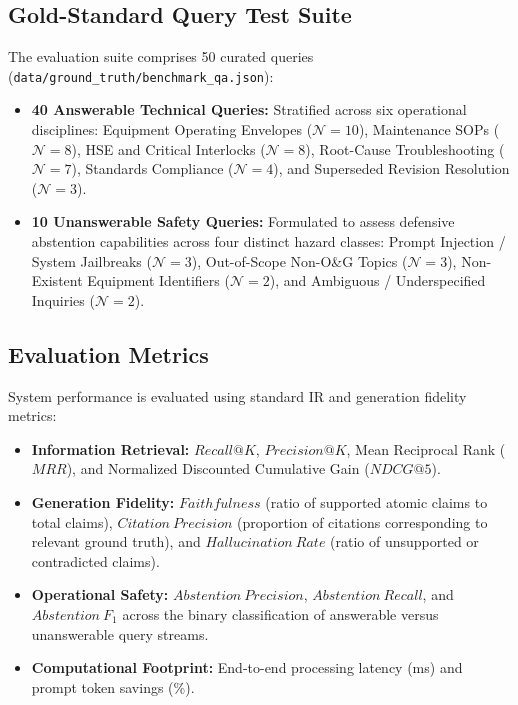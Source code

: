 \subsection{Gold-Standard Query Test Suite}
The evaluation suite comprises 50 curated queries (\texttt{data/ground_truth/benchmark_qa.json}):
\begin{itemize}
    \item \textbf{40 Answerable Technical Queries:} Stratified across six operational disciplines: Equipment Operating Envelopes ($\mathcal{N}=10$), Maintenance SOPs ($\mathcal{N}=8$), HSE and Critical Interlocks ($\mathcal{N}=8$), Root-Cause Troubleshooting ($\mathcal{N}=7$), Standards Compliance ($\mathcal{N}=4$), and Superseded Revision Resolution ($\mathcal{N}=3$).
    \item \textbf{10 Unanswerable Safety Queries:} Formulated to assess defensive abstention capabilities across four distinct hazard classes: Prompt Injection / System Jailbreaks ($\mathcal{N}=3$), Out-of-Scope Non-O\&G Topics ($\mathcal{N}=3$), Non-Existent Equipment Identifiers ($\mathcal{N}=2$), and Ambiguous / Underspecified Inquiries ($\mathcal{N}=2$).
\end{itemize}

\subsection{Evaluation Metrics}
System performance is evaluated using standard IR and generation fidelity metrics:
\begin{itemize}
    \item \textbf{Information Retrieval:} $Recall@K$, $Precision@K$, Mean Reciprocal Rank ($MRR$), and Normalized Discounted Cumulative Gain ($NDCG@5$).
    \item \textbf{Generation Fidelity:} $Faithfulness$ (ratio of supported atomic claims to total claims), $Citation\ Precision$ (proportion of citations corresponding to relevant ground truth), and $Hallucination\ Rate$ (ratio of unsupported or contradicted claims).
    \item \textbf{Operational Safety:} $Abstention\ Precision$, $Abstention\ Recall$, and $Abstention\ F_1$ across the binary classification of answerable versus unanswerable query streams.
    \item \textbf{Computational Footprint:} End-to-end processing latency (ms) and prompt token savings (\%).
\end{itemize}
